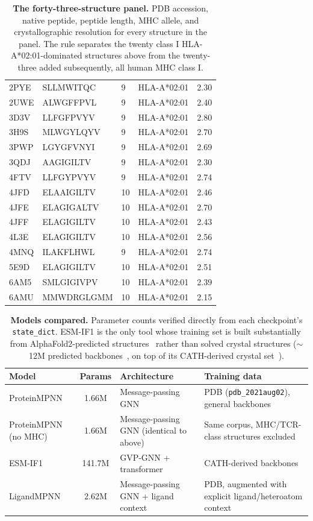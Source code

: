 \documentclass{article}
\begin{document}
\begin{table}[p]
\begin{tabular}{lllll}
2PYE & SLLMWITQC & 9 & HLA-A*02:01 & 2.30 \\
2UWE & ALWGFFPVL & 9 & HLA-A*02:01 & 2.40 \\
3D3V & LLFGFPVYV & 9 & HLA-A*02:01 & 2.80 \\
3H9S & MLWGYLQYV & 9 & HLA-A*02:01 & 2.70 \\
3PWP & LGYGFVNYI & 9 & HLA-A*02:01 & 2.69 \\
3QDJ & AAGIGILTV & 9 & HLA-A*02:01 & 2.30 \\
4FTV & LLFGYPVYV & 9 & HLA-A*02:01 & 2.74 \\
4JFD & ELAAIGILTV & 10 & HLA-A*02:01 & 2.46 \\
4JFE & ELAGIGALTV & 10 & HLA-A*02:01 & 2.70 \\
4JFF & ELAGIGILTV & 10 & HLA-A*02:01 & 2.43 \\
4L3E & ELAGIGILTV & 10 & HLA-A*02:01 & 2.56 \\
4MNQ & ILAKFLHWL & 9 & HLA-A*02:01 & 2.74 \\
5E9D & ELAGIGILTV & 10 & HLA-A*02:01 & 2.51 \\
6AM5 & SMLGIGIVPV & 10 & HLA-A*02:01 & 2.39 \\
6AMU & MMWDRGLGMM & 10 & HLA-A*02:01 & 2.15 \\
\bottomrule
\end{tabular}
\caption{\textbf{The forty-three-structure panel.} PDB accession, native peptide,
peptide length, MHC allele, and crystallographic resolution for every structure in the panel.
The rule separates the twenty class I HLA-A*02:01-dominated structures above from the twenty-three
added subsequently, all human MHC class I.}
\label{tab:pdblist}
\end{table}

\begin{table}[p]
\renewcommand{\thetable}{S2}
\centering
\small
\begin{tabular}{@{}lcp{4.2cm}p{5.2cm}@{}}
\toprule
Model & Params & Architecture & Training data \\
\midrule
ProteinMPNN & 1.66M & Message-passing GNN & PDB (\texttt{pdb\_2021aug02}), general backbones \\[2pt]
ProteinMPNN (no MHC) & 1.66M & Message-passing GNN (identical to above) & Same corpus, MHC/TCR-class structures excluded \\[2pt]
ESM-IF1 & 141.7M & GVP-GNN + transformer & CATH-derived backbones \\[2pt]
LigandMPNN & 2.62M & Message-passing GNN + ligand context & PDB, augmented with explicit ligand/heteroatom context \\
\bottomrule
\end{tabular}
\caption{\textbf{Models compared.} Parameter counts verified directly from each
checkpoint's \texttt{state\_dict}. ESM-IF1 is the only tool whose training set is built substantially
from AlphaFold2-predicted structures~\citep{jumper2021alphafold} rather than solved crystal structures ($\sim$12M predicted backbones~\citep{hsu2022esmif},
on top of its CATH-derived crystal set~\citep{sillitoe2021cath}).}
\label{tab:models}
\end{table}
\end{document}

